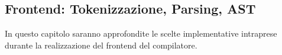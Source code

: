 \subsection{Frontend: Tokenizzazione, Parsing, AST}
In questo capitolo saranno approfondite le scelte implementative intraprese durante 
la realizzazione del frontend del compilatore.


\newpage


\newpage


\newpage


\newpage


\newpage